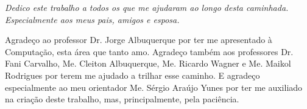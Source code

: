 \documentclass[
	12pt,				%
	openany,			%
	oneside,			%
	a4paper,			%
	english,			%
	brazil				%
	]{{Modelo/abntex2_FBUNI}}
\begin{document}


\frenchspacing 


\imprimircapa

\imprimirfolhaderosto*

\imprimirfolhadeaprovacao

%
%
\cleardoublepage

\begin{dedicatoria}
   \vspace*{\fill}
   \centering
   \noindent
   \textit{
    Dedico este trabalho a todos os que me ajudaram ao longo desta caminhada. Especialmente aos meus pais, amigos e esposa.
   }
   \vspace*{\fill}
\end{dedicatoria}

\begin{agradecimentos}
    Agradeço ao professor Dr. Jorge Albuquerque por ter me apresentado à Computação, esta área que tanto amo. Agradeço também aos professores Dr. Fani Carvalho, Me. Cleiton Albuquerque, Me. Ricardo Wagner e Me. Maikol Rodrigues por terem me ajudado a trilhar esse caminho. E agradeço especialmente ao meu orientador Me. Sérgio Araújo Yunes por ter me auxiliado na criação deste trabalho, mas, principalmente, pela paciência.
    
\end{agradecimentos}
\end{document}
